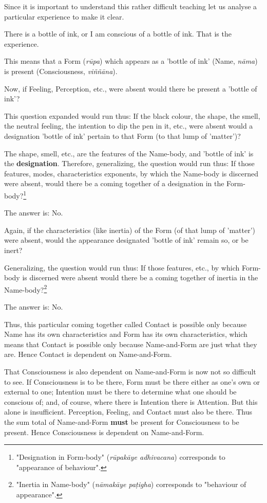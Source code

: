 Since it is important to understand this rather difficult teaching let us analyse a particular experience to make it clear.

There is a bottle of ink, or I am conscious of a bottle of ink. That is the experience.

This means that a Form (\emph{rūpa}) which appears as a 'bottle of ink' (Name, \emph{nāma}) is present (Consciousness, \emph{viññāna}).

Now, if Feeling, Perception, etc., were absent would there be present a 'bottle of ink'?

This question expanded would run thus: If the black colour, the shape, the smell, the neutral feeling, the intention to dip the pen in it, etc., were absent would a designation 'bottle of ink' pertain to that Form (to that lump of 'matter')?

The shape, smell, etc., are the features of the Name-body, and 'bottle of ink' is the \textbf{designation}. Therefore, generalizing, the question would run thus: If those features, modes, characteristics exponents, by which the Name-body is discerned were absent, would there be a coming together of a designation in the Form-body?\footnote{"Designation in Form-body" (\emph{rūpakāye adhivacana}) corresponds to "appearance of behaviour".}

The answer is: No.

Again, if the characteristics (like inertia) of the Form (of that lump of 'matter') were absent, would the appearance designated 'bottle of ink' remain so, or be inert?

Generalizing, the question would run thus: If those features, etc., by which Form-body is discerned were absent would there be a coming together of inertia in the Name-body?\footnote{"Inertia in Name-body" (\emph{nāmakāye paṭigha}) corresponds to "behaviour of appearance".}

The answer is: No.

Thus, this particular coming together called Contact is possible only because Name has its own characteristics and Form has its own characteristics, which means that Contact is possible only because Name-and-Form are just what they are. Hence Contact is dependent on Name-and-Form.

That Consciousness is also dependent on Name-and-Form is now not so difficult to see. If Consciousness is to be there, Form must be there either as one's own or external to one; Intention must be there to determine what one should be conscious of; and, of course, where there is Intention there is Attention. But this alone is insufficient. Perception, Feeling, and Contact must also be there. Thus the sum total of Name-and-Form \textbf{must} be present for Consciousness to be present. Hence Consciousness is dependent on Name-and-Form.

